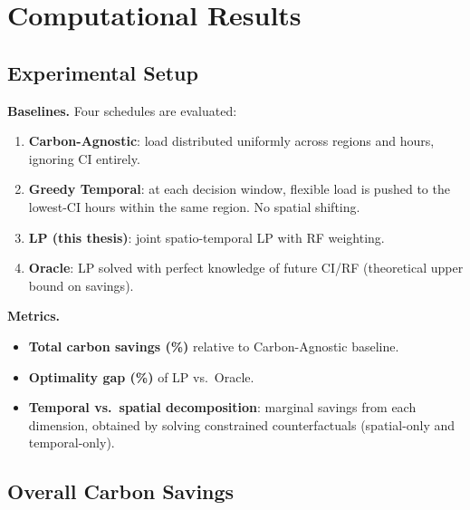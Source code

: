 \section{Computational Results}
\label{sec:results}


\subsection{Experimental Setup}

\textbf{Baselines.}
Four schedules are evaluated:
\begin{enumerate}[leftmargin=1.5em]
  \item \textbf{Carbon-Agnostic}: load distributed uniformly across regions and hours, ignoring CI entirely.
  \item \textbf{Greedy Temporal}: at each decision window, flexible load is pushed to the lowest-CI hours within the same region. No spatial shifting.
  \item \textbf{LP (this thesis)}: joint spatio-temporal LP with RF weighting.
  \item \textbf{Oracle}: LP solved with perfect knowledge of future CI/RF (theoretical upper bound on savings).
\end{enumerate}

\textbf{Metrics.}
\begin{itemize}[leftmargin=1.5em]
  \item \textbf{Total carbon savings (\%)} relative to Carbon-Agnostic baseline.
  \item \textbf{Optimality gap (\%)} of LP vs.\ Oracle.
  \item \textbf{Temporal vs.\ spatial decomposition}: marginal savings from each dimension, obtained by solving constrained counterfactuals (spatial-only and temporal-only).
\end{itemize}

\subsection{Overall Carbon Savings}


